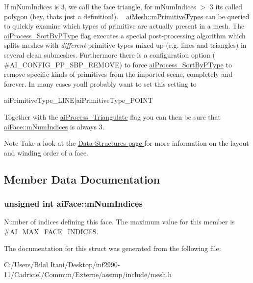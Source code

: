 If m\+Num\+Indices is 3, we call the face \textquotesingle{}triangle\textquotesingle{}, for m\+Num\+Indices $>$ 3 it\textquotesingle{}s called \textquotesingle{}polygon\textquotesingle{} (hey, that\textquotesingle{}s just a definition!). ~\newline
 \hyperlink{structai_mesh_a99d66ac0a444068c1b252b30265cbf53}{ai\+Mesh\+::m\+Primitive\+Types} can be queried to quickly examine which types of primitive are actually present in a mesh. The \hyperlink{postprocess_8h_a64795260b95f5a4b3f3dc1be4f52e410ab4484f73635d633cd79973bac1431ed6}{ai\+Process\+\_\+\+Sort\+By\+P\+Type} flag executes a special post-\/processing algorithm which splits meshes with {\itshape different} primitive types mixed up (e.\+g. lines and triangles) in several \textquotesingle{}clean\textquotesingle{} submeshes. Furthermore there is a configuration option ( \#\+A\+I\+\_\+\+C\+O\+N\+F\+I\+G\+\_\+\+P\+P\+\_\+\+S\+B\+P\+\_\+\+R\+E\+M\+O\+VE) to force \hyperlink{postprocess_8h_a64795260b95f5a4b3f3dc1be4f52e410ab4484f73635d633cd79973bac1431ed6}{ai\+Process\+\_\+\+Sort\+By\+P\+Type} to remove specific kinds of primitives from the imported scene, completely and forever. In many cases you\textquotesingle{}ll probably want to set this setting to 
\begin{DoxyCode}
aiPrimitiveType\_LINE|aiPrimitiveType\_POINT
\end{DoxyCode}
 Together with the \hyperlink{postprocess_8h_a64795260b95f5a4b3f3dc1be4f52e410a9c3de834f0307f31fa2b1b6d05dd592b}{ai\+Process\+\_\+\+Triangulate} flag you can then be sure that \hyperlink{structai_face_adda2698cec0ebfe651572f4a5701360b}{ai\+Face\+::m\+Num\+Indices} is always 3. \begin{DoxyNote}{Note}
Take a look at the \hyperlink{}{Data Structures page } for more information on the layout and winding order of a face. 
\end{DoxyNote}


\subsection{Member Data Documentation}
\subsubsection[{\texorpdfstring{m\+Num\+Indices}{mNumIndices}}]{\setlength{\rightskip}{0pt plus 5cm}unsigned int ai\+Face\+::m\+Num\+Indices}\hypertarget{structai_face_adda2698cec0ebfe651572f4a5701360b}{}\label{structai_face_adda2698cec0ebfe651572f4a5701360b}
Number of indices defining this face. The maximum value for this member is \#\+A\+I\+\_\+\+M\+A\+X\+\_\+\+F\+A\+C\+E\+\_\+\+I\+N\+D\+I\+C\+ES. 

The documentation for this struct was generated from the following file\+:\begin{DoxyCompactItemize}
\item 
C\+:/\+Users/\+Bilal Itani/\+Desktop/inf2990-\/11/\+Cadriciel/\+Commun/\+Externe/assimp/include/mesh.\+h\end{DoxyCompactItemize}

